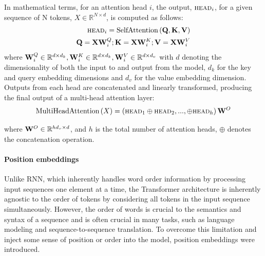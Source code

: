 In mathematical terms, for an attention head $i$, the output, $\textsc{head}_i$, for a given sequence of N tokens, $X \in \mathbb{R}^{N \times d}$, is computed as follows:
\begin{align}
\textsc{head}_i = \text{SelfAttention}\left({\mathbf Q},{\mathbf K},{\mathbf V}\right) \nonumber \\
{\mathbf Q} = {\mathbf X}{\mathbf W_i^Q}; {\mathbf K} = {\mathbf X}{\mathbf W_i^K};{\mathbf V} = {\mathbf X}{\mathbf W_i^V} 
\end{align}
where ${\mathbf W_i^Q} \in \mathbb{R}^{d \times d_k}, {\mathbf W_i^K} \in \mathbb{R}^{d \times d_k},{\mathbf W_i^V} \in \mathbb{R}^{d \times d_v}$ with $d$ denoting the dimensionality of both the input to and output from the model, $d_k$ for the key and query embedding dimensions and $d_v$ for the value embedding dimension. Outputs from each head are concatenated and linearly transformed, producing the final output of a multi-head attention layer: 
\begin{equation}
    \text{MultiHeadAttention}\left(X\right) = \left(\textsc{head}_1 \oplus \textsc{head}_2,...,\oplus \textsc{head}_h \right) {\mathbf W}^O
\end{equation}

\noindent where ${\mathbf W}^O \in \mathbb{R}^{hd_v \times d}$, and $h$ is the total number of attention heads, $\oplus$ denotes the concatenation operation.


\paragraph{Position embeddings} Unlike RNN, which inherently handles word order information by processing input sequences one element at a time, the Transformer architecture is inherently agnostic to the order of tokens by considering all tokens in the input sequence simultaneously. However, the order of words is crucial to the semantics and syntax of a sequence and is often crucial in many tasks, such as language modeling and sequence-to-sequence translation. To overcome this limitation and inject some sense of position or order into the model, position embeddings were introduced.

